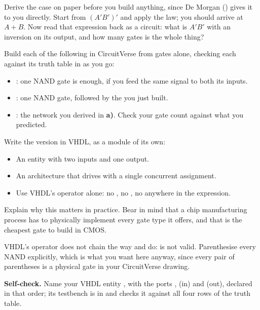  Derive the  case on paper before you build anything, since De Morgan
() gives it to you directly. Start from $(A'B')'$ and apply the law; you
should arrive at $A + B$. Now read that expression back as a circuit: what is $A'B'$ with an
inversion on its output, and how many  gates is the whole thing?

 Build each of the following in CircuitVerse from  gates alone, checking each
against its truth table in  as you go:
\begin{itemize}
  \item {}: one NAND gate is enough, if you feed the same signal to both its inputs.
  \item {}: one NAND gate, followed by the  you just built.
  \item {}: the network you derived in \textbf{a)}. Check your gate count against what
    you predicted.
\end{itemize}

 Write the  version in VHDL, as a module of its own:
\begin{itemize}
  \item An entity with two  inputs and one  output.
  \item An architecture that drives  with a single concurrent assignment.
  \item Use VHDL's  operator alone: no , no , no 
    anywhere in the expression.
\end{itemize}

 Explain why this matters in practice. Bear in mind that a chip manufacturing process has
to physically implement every gate type it offers, and that  is the cheapest gate to
build in CMOS.

\note[Hint]VHDL's  operator does not chain the way  and  do:
 is not valid. Parenthesise every NAND explicitly, which is what you want
here anyway, since every pair of parentheses is a physical gate in your CircuitVerse drawing.


\begin{selfcheck}
\textbf{Self-check.} Name your VHDL entity , with the ports , 
(in) and  (out), declared in that order; its testbench is in
 and checks it against all four rows of the  truth table.
\end{selfcheck}

